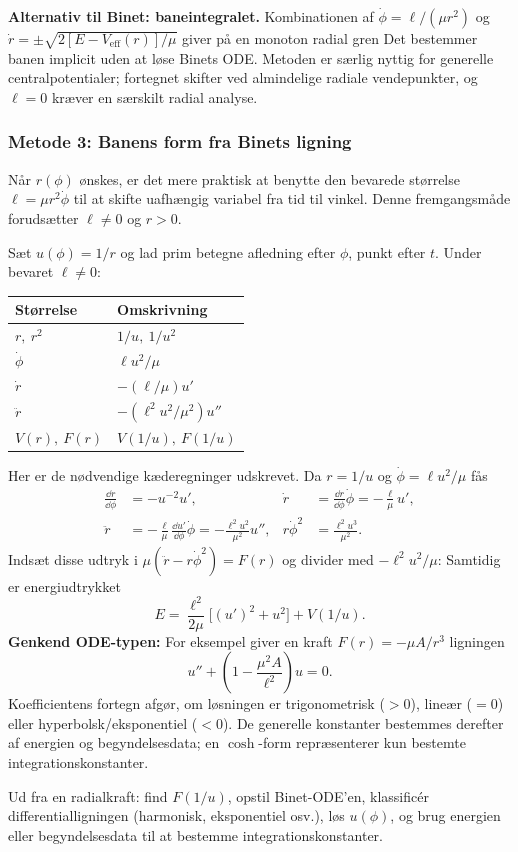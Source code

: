 \textbf{Alternativ til Binet: baneintegralet.} Kombinationen af
$\dot\phi=\ell/(\mu r^2)$ og
$\dot r=\pm\sqrt{2[E-V_{\mathrm{eff}}(r)]/\mu}$ giver på en monoton radial gren
Det bestemmer banen implicit uden at løse Binets ODE. Metoden er særlig nyttig for generelle centralpotentialer; fortegnet skifter ved almindelige radiale vendepunkter, og $\ell=0$ kræver en særskilt radial analyse.

\subsubsection*{Metode 3: Banens form fra Binets ligning}\label{sec:binet}
Når $r(\phi)$ ønskes, er det mere praktisk at benytte den bevarede størrelse $\ell=\mu r^2\dot\phi$ til at skifte uafhængig variabel fra tid til vinkel. Denne fremgangsmåde forudsætter $\ell\ne0$ og $r>0$.

Sæt $u(\phi)=1/r$ og lad prim betegne afledning efter $\phi$, punkt efter $t$. Under bevaret $\ell\ne0$:
\begin{center}\small\renewcommand{\arraystretch}{1.22}\begin{tabular}{ll}\toprule Størrelse & Omskrivning\\\midrule
$r,\ r^2$ & $1/u,\ 1/u^2$\\
$\dot\phi$ & $\ell u^2/\mu$\\
$\dot r$ & $-(\ell/\mu)u'$\\
$\ddot r$ & $-(\ell^2u^2/\mu^2)u''$\\
$V(r),\ F(r)$ & $V(1/u),\ F(1/u)$\\\bottomrule\end{tabular}\end{center}
Her er de nødvendige kæderegninger udskrevet. Da $r=1/u$ og $\dot\phi=\ell u^2/\mu$ fås
\begin{align*}
\frac{\dd r}{\dd\phi}&=-u^{-2}u',
&\dot r&=\frac{\dd r}{\dd\phi}\dot\phi=-\frac{\ell}{\mu}u',\\
\ddot r&=-\frac{\ell}{\mu}\frac{\dd u'}{\dd\phi}\dot\phi
=-\frac{\ell^2u^2}{\mu^2}u'',
&r\dot\phi^2&=\frac{\ell^2u^3}{\mu^2}.
\end{align*}
Indsæt disse udtryk i $\mu(\ddot r-r\dot\phi^2)=F(r)$ og divider med $-\ell^2u^2/\mu$:
Samtidig er energiudtrykket
\[\boxed{E=\frac{\ell^2}{2\mu}\big[(u')^2+u^2\big]+V(1/u)}.\]
\textbf{Genkend ODE-typen:} For eksempel giver en kraft $F(r)=-\mu A/r^3$ ligningen
\[u''+\left(1-\frac{\mu^2A}{\ell^2}\right)u=0.\]
Koefficientens fortegn afgør, om løsningen er trigonometrisk ($>0$), lineær ($=0$) eller hyperbolsk/eksponentiel ($<0$). De generelle konstanter bestemmes derefter af energien og begyndelsesdata; en $\cosh$-form repræsenterer kun bestemte integrationskonstanter.
\begin{method}Ud fra en radialkraft: find $F(1/u)$, opstil Binet-ODE'en, klassificér differentialligningen (harmonisk, eksponentiel osv.), løs $u(\phi)$, og brug energien eller begyndelsesdata til at bestemme integrationskonstanter.\end{method}

